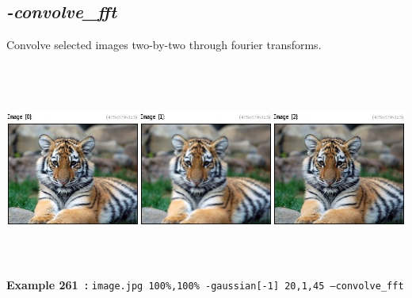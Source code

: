 \documentclass[a4paper,11pt,twoside]{book}
\begin{document}
\subsection{\emph{-convolve\_fft} }\vspace*{-0.5em}
Convolve selected images two-by-two through fourier transforms.
\begin{center}\includegraphics[keepaspectratio=true,height=7cm,width=\textwidth]{img/gmic_def261.jpg}\\
{\footnotesize \textbf{Example 261~:} \texttt{image.jpg 100\%,100\% -gaussian[-1] 20,1,45 --convolve\_fft}}
\end{center}
\end{document}
